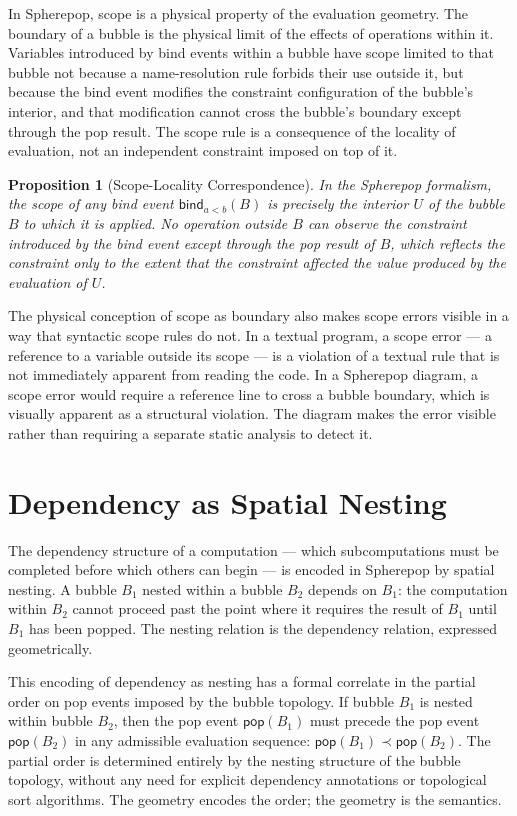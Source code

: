 \documentclass[12pt,openany]{book}
\theoremstyle{plain}
\newtheorem{proposition}[theorem]{Proposition}
\theoremstyle{definition}
\theoremstyle{remark}
\newcommand{\spop}[1]{\mathsf{pop}\!\left(#1\right)}
\newcommand{\sbind}[2]{\mathsf{bind}_{#1}\!\left(#2\right)}
\begin{document}
In Spherepop, scope is a physical property of the evaluation geometry. The boundary of a bubble is the physical limit of the effects of operations within it. Variables introduced by bind events within a bubble have scope limited to that bubble not because a name-resolution rule forbids their use outside it, but because the bind event modifies the constraint configuration of the bubble's interior, and that modification cannot cross the bubble's boundary except through the pop result. The scope rule is a consequence of the locality of evaluation, not an independent constraint imposed on top of it.

\begin{proposition}[Scope-Locality Correspondence]
In the Spherepop formalism, the scope of any bind event $\sbind{a<b}{B}$ is precisely the interior $U$ of the bubble $B$ to which it is applied. No operation outside $B$ can observe the constraint introduced by the bind event except through the pop result of $B$, which reflects the constraint only to the extent that the constraint affected the value produced by the evaluation of $U$.
\end{proposition}

The physical conception of scope as boundary also makes scope errors visible in a way that syntactic scope rules do not. In a textual program, a scope error — a reference to a variable outside its scope — is a violation of a textual rule that is not immediately apparent from reading the code. In a Spherepop diagram, a scope error would require a reference line to cross a bubble boundary, which is visually apparent as a structural violation. The diagram makes the error visible rather than requiring a separate static analysis to detect it.

\section{Dependency as Spatial Nesting}

The dependency structure of a computation — which subcomputations must be completed before which others can begin — is encoded in Spherepop by spatial nesting. A bubble $B_1$ nested within a bubble $B_2$ depends on $B_1$: the computation within $B_2$ cannot proceed past the point where it requires the result of $B_1$ until $B_1$ has been popped. The nesting relation is the dependency relation, expressed geometrically.

This encoding of dependency as nesting has a formal correlate in the partial order on pop events imposed by the bubble topology. If bubble $B_1$ is nested within bubble $B_2$, then the pop event $\spop{B_1}$ must precede the pop event $\spop{B_2}$ in any admissible evaluation sequence: $\spop{B_1} \prec \spop{B_2}$. The partial order is determined entirely by the nesting structure of the bubble topology, without any need for explicit dependency annotations or topological sort algorithms. The geometry encodes the order; the geometry is the semantics.
\end{document}
